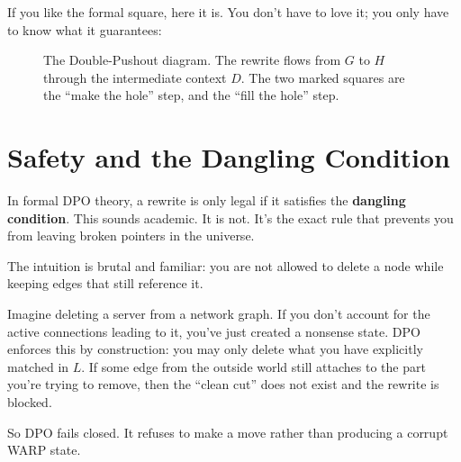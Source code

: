 If you like the formal square, here it is. You don't have to love it; you only have to know what it guarantees:

\begin{figure}[h]
    \centering
    \caption{The Double-Pushout diagram. The rewrite flows from $G$ to $H$ through the intermediate context $D$. The two marked squares are the ``make the hole'' step, and the ``fill the hole'' step.}
    \label{fig:dpo-diagram}
\end{figure}

\section{Safety and the Dangling Condition}
\label{sec:dangling-condition}

In formal DPO theory, a rewrite is only legal if it satisfies the \textbf{dangling condition}. This sounds academic. It is not. It's the exact rule that prevents you from leaving broken pointers in the universe.

The intuition is brutal and familiar: you are not allowed to delete a node while keeping edges that still reference it.

Imagine deleting a server from a network graph. If you don't account for the active connections leading to it, you've just created a nonsense state. DPO enforces this by construction: you may only delete what you have explicitly matched in $L$. If some edge from the outside world still attaches to the part you're trying to remove, then the ``clean cut'' does not exist and the rewrite is blocked.

So DPO fails closed. It refuses to make a move rather than producing a corrupt WARP state.

